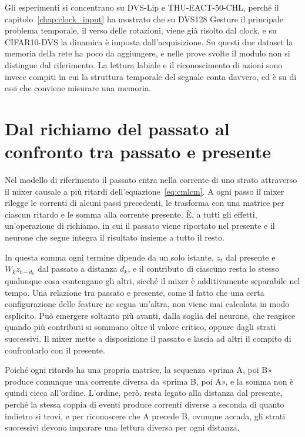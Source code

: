 Gli esperimenti si concentrano su DVS-Lip e THU-EACT-50-CHL, perché il capitolo~\ref{chap:clock_input} ha mostrato che su DVS128 Gesture il principale problema temporale, il verso delle rotazioni, viene già risolto dal clock, e su CIFAR10-DVS la dinamica è imposta dall'acquisizione. Su questi due dataset la memoria della rete ha poco da aggiungere, e nelle prove svolte il modulo non si distingue dal riferimento. La lettura labiale e il riconoscimento di azioni sono invece compiti in cui la struttura temporale del segnale conta davvero, ed è su di essi che conviene misurare una memoria.



\section{Dal richiamo del passato al confronto tra passato e presente}
\label{sec:richiamo_confronto}

Nel modello di riferimento il passato entra nella corrente di uno strato attraverso il mixer causale a più ritardi dell'equazione~\eqref{eq:cmlcm}. A ogni passo il mixer rilegge le correnti di alcuni passi precedenti, le trasforma con una matrice per ciascun ritardo e le somma alla corrente presente. È, a tutti gli effetti, un'operazione di richiamo, in cui il passato viene riportato nel presente e il neurone che segue integra il risultato insieme a tutto il resto.

In questa somma ogni termine dipende da un solo istante, $z_t$ dal presente e $W_kz_{t-d_k}$ dal passato a distanza $d_k$, e il contributo di ciascuno resta lo stesso qualunque cosa contengano gli altri, sicché il mixer è additivamente separabile nel tempo. Una relazione tra passato e presente, come il fatto che una certa configurazione delle feature ne segua un'altra, non viene mai calcolata in modo esplicito. Può emergere soltanto più avanti, dalla soglia del neurone, che reagisce quando più contributi si sommano oltre il valore critico, oppure dagli strati successivi. Il mixer mette a disposizione il passato e lascia ad altri il compito di confrontarlo con il presente.

Poiché ogni ritardo ha una propria matrice, la sequenza «prima A, poi B» produce comunque una corrente diversa da «prima B, poi A», e la somma non è quindi cieca all'ordine. L'ordine, però, resta legato alla distanza dal presente, perché la stessa coppia di eventi produce correnti diverse a seconda di quanto indietro si trovi, e per riconoscere che A precede B, ovunque accada, gli strati successivi devono imparare una lettura diversa per ogni distanza.

